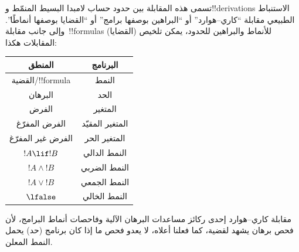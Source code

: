 \documentclass[../../../include/open-logic-section]{subfiles}
\begin{document}
تسمى هذه المقابلة بين حدود حساب لامبدا البسيط المنمّط و!!{derivation}s
الاستنباط الطبيعي مقابلة ``كاري--هوارد'' أو ``البراهين بوصفها برامج'' أو
``القضايا بوصفها أنماطًا''. وإلى جانب مقابلة~!!{formula}s (القضايا) للأنماط
والبراهين للحدود، يمكن تلخيص المقابلات هكذا:
\begin{center}
  \begin{tabular}{c c}
    المنطق & البرنامج \\
    \hline
    القضية/!!{formula} & النمط \\
    البرهان & الحد \\
    الفرض & المتغير \\
    الفرض المفرّغ & المتغير المقيّد \\
    الفرض غير المفرّغ & المتغير الحر \\
    $!A \lif !B$ & النمط الدالي \\
    $!A \land !B$ & النمط الضربي \\
    $!A \lor !B$ & النمط الجمعي \\
    $\lfalse$ & النمط الخالي \\
    \hline
  \end{tabular}
\end{center}

مقابلة كاري--هوارد إحدى ركائز مساعدات البرهان الآلية وفاحصات أنماط البرامج،
لأن فحص برهان يشهد لقضية، كما فعلنا أعلاه، لا يعدو فحص ما إذا كان برنامج
(حد) يحمل النمط المعلن.
\end{document}
